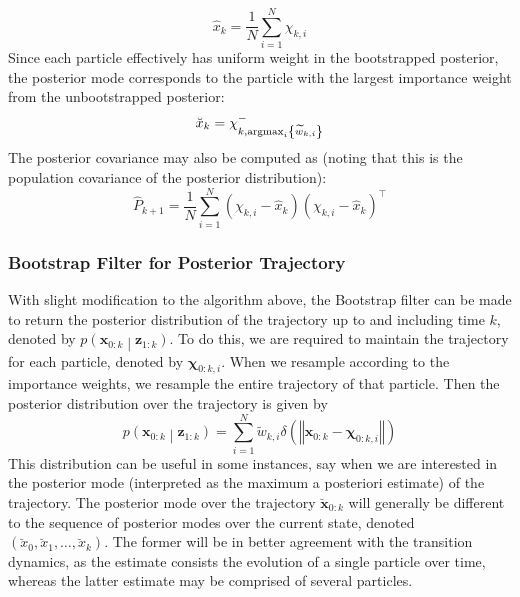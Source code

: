 \documentclass[11pt]{report} %
\begin{document}
\begin{equation}
\hat{x}_{k} = \dfrac{1}{N}\sum_{i = 1}^{N}\chi_{k, i}
\end{equation}
Since each particle effectively has uniform weight in the bootstrapped posterior, the posterior mode corresponds to the particle with the largest importance weight from the unbootstrapped posterior:
\begin{equation}
\breve{x}_{k} = \chi_{k, \operatorname*{argmax}_{i}\left\{\widetilde{w}_{k, i}\right\}}^{-}
\end{equation}
The posterior covariance may also be computed as (noting that this is the population covariance of the posterior distribution):
\begin{equation}
\hat{P}_{k + 1} = \dfrac{1}{N}\sum_{i = 1}^{N}\left(\chi_{k, i} - \hat{x}_{k}\right)\left(\chi_{k, i} - \hat{x}_{k}\right)^{\top}
\end{equation}

\subsubsection{Bootstrap Filter for Posterior Trajectory}

With slight modification to the algorithm above, the Bootstrap filter can be made to return the posterior distribution of the trajectory up to and including time $k$, denoted by $p\left(\mathbf{x}_{0:k}\middle|\mathbf{z}_{1:k}\right)$. To do this, we are required to maintain the trajectory for each particle, denoted by $\boldsymbol{\chi}_{0:k, i}$. When we resample according to the importance weights, we resample the entire trajectory of that particle. Then the posterior distribution over the trajectory is given by
\begin{equation}
p\left(\mathbf{x}_{0:k}\middle|\mathbf{z}_{1:k}\right) = \sum_{i = 1}^{N}\widetilde{w}_{k, i}\delta\left(\left\Vert \mathbf{x}_{0:k} - \boldsymbol{\chi}_{0:k, i}\right\Vert\right)
\end{equation}
This distribution can be useful in some instances, say when we are interested in the posterior mode (interpreted as the maximum a posteriori estimate) of the trajectory. The posterior mode over the trajectory $\breve{\mathbf{x}}_{0:k}$ will generally be different to the sequence of posterior modes over the current state, denoted $\left(\breve{x}_{0}, \breve{x}_{1}, \dots, \breve{x}_{k}\right)$. The former will be in better agreement with the transition dynamics, as the estimate consists the evolution of a single particle over time, whereas the latter estimate may be comprised of several particles.
\end{document}
